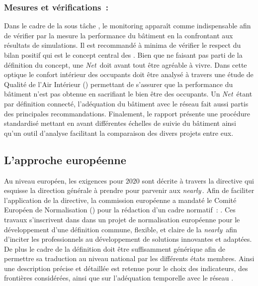 \subsubsection{Mesures et vérifications~:} %
\label{ssub:mesures_et_verifications}
Dans le cadre de la sous tâche  \parencite{Noris2013}, le monitoring apparaît comme indispensable
afin de vérifier par la mesure la performance du bâtiment en la confrontant aux
résultats de simulations. Il est recommandé à minima de vérifier le respect du bilan
positif qui est le concept central des . Bien que ne faisant pas parti de
la définition du concept, une \textit{Net}\, doit avant tout être agréable à vivre. Dans cette
optique le confort intérieur des occupants doit être analysé à travers une étude de
Qualité de l’Air Intérieur () permettant de s’assurer que la performance du bâtiment n’est pas
obtenue en sacrifiant le bien être des occupants. Un \textit{Net}\, étant par définition connecté,
l’adéquation du bâtiment avec le réseau fait aussi partis des principales recommandations.
Finalement, le rapport présente une procédure standardisé mettant en avant différentes échelles
de suivie du bâtiment ainsi qu’un outil d’analyse facilitant la comparaison des divers projets entre eux.


\subsection{L’approche européenne} %
\label{ssub:l_approche_europeenne}
Au niveau européen, les exigences pour $2020$ sont décrite à travers la directive
 \parencite{EPBD2010} qui esquisse la direction générale à prendre pour
parvenir aux \textit{nearly}\,. Afin de faciliter l’application de la directive, la commission
européenne a mandaté le Comité Européen de Normalisation ()
pour la rédaction d’un cadre normatif~:  . Ces travaux s’inscrivent
dans dans un projet de normalisation européenne pour le développement d’une définition
commune, flexible, et claire de la \textit{nearly}\, afin d’inciter les professionnels au développement
de solutions innovantes et adaptées. De plus le cadre de la définition doit être
suffisamment générique afin de permettre sa traduction au niveau national par les différents
états membres. Ainsi une description précise et détaillée est retenue pour le choix des indicateurs,
des frontières considérées, ainsi que sur l’adéquation temporelle avec le réseau \parencite{Zirngibl2014}.


